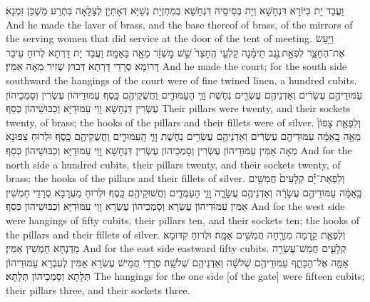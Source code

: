 {{{}}
{וַעֲבַד יָת כִּיּוֹרָא דִּנְחָשָׁא וְיָת בְּסִיסֵיהּ דִּנְחָשָׁא בְּמִחְזְיָת נְשַׁיָּא דְּאָתְיָן לְצַלָּאָה בִּתְרַע מַשְׁכַּן זִמְנָא׃}
{And he made the laver of brass, and the base thereof of brass, of the mirrors of the serving women that did service at the door of the tent of meeting.}{}
{וַיַּ֖עַשׂ אֶת־הֶחָצֵ֑ר לִפְאַ֣ת \legarmeh  נֶ֣גֶב תֵּימָ֗נָה קַלְעֵ֤י הֶֽחָצֵר֙ שֵׁ֣שׁ מׇשְׁזָ֔ר מֵאָ֖ה בָּאַמָּֽה׃}
{וַעֲבַד יָת דָּרְתָא לְרוּחַ עֵיבַר דָּרוֹמָא סְרָדֵי דָּרְתָא דְּבוּץ שְׁזִיר מְאָה אַמִּין׃}
{And he made the court; for the south side southward the hangings of the court were of fine twined linen, a hundred cubits.}{}
{עַמּוּדֵיהֶ֣ם עֶשְׂרִ֔ים וְאַדְנֵיהֶ֥ם עֶשְׂרִ֖ים נְחֹ֑שֶׁת וָוֵ֧י הָעַמּוּדִ֛ים וַחֲשֻׁקֵיהֶ֖ם כָּֽסֶף׃}
{עַמּוּדֵיהוֹן עֶשְׂרִין וְסָמְכֵיהוֹן עֶשְׂרִין דִּנְחָשָׁא וָוֵי עַמּוּדַיָּא וְכִבּוּשֵׁיהוֹן כְּסַף׃}
{Their pillars were twenty, and their sockets twenty, of brass; the hooks of the pillars and their fillets were of silver.}{}
{וְלִפְאַ֤ת צָפוֹן֙ מֵאָ֣ה בָֽאַמָּ֔ה עַמּוּדֵיהֶ֣ם עֶשְׂרִ֔ים וְאַדְנֵיהֶ֥ם עֶשְׂרִ֖ים נְחֹ֑שֶׁת וָוֵ֧י הָֽעַמּוּדִ֛ים וַחֲשֻׁקֵיהֶ֖ם כָּֽסֶף׃}
{וּלְרוּחַ צִפּוּנָא מְאָה אַמִּין עַמּוּדֵיהוֹן עֶשְׂרִין וְסָמְכֵיהוֹן עֶשְׂרִין דִּנְחָשָׁא וָוֵי עַמּוּדַיָּא וְכִבּוּשֵׁיהוֹן כְּסַף׃}
{And for the north side a hundred cubits, their pillars twenty, and their sockets twenty, of brass; the hooks of the pillars and their fillets of silver.}{}
{וְלִפְאַת־יָ֗ם קְלָעִים֙ חֲמִשִּׁ֣ים בָּֽאַמָּ֔ה עַמּוּדֵיהֶ֣ם עֲשָׂרָ֔ה וְאַדְנֵיהֶ֖ם עֲשָׂרָ֑ה וָוֵ֧י הָעַמֻּדִ֛ים וַחֲשׁוּקֵיהֶ֖ם כָּֽסֶף׃}
{וּלְרוּחַ מַעְרָבָא סְרָדֵי חַמְשִׁין אַמִּין עַמּוּדֵיהוֹן עֶשְׂרָא וְסָמְכֵיהוֹן עֶשְׂרָא וָוֵי עַמּוּדַיָּא וְכִבּוּשֵׁיהוֹן כְּסַף׃}
{And for the west side were hangings of fifty cubits, their pillars ten, and their sockets ten; the hooks of the pillars and their fillets of silver.}{}
{וְלִפְאַ֛ת קֵ֥דְמָה מִזְרָ֖חָה חֲמִשִּׁ֥ים אַמָּֽה׃}
{וּלְרוּחַ קִדּוּמָא מַדְנְחָא חַמְשִׁין אַמִּין׃}
{And for the east side eastward fifty cubits.}{}
{קְלָעִ֛ים חֲמֵשׁ־עֶשְׂרֵ֥ה אַמָּ֖ה אֶל־הַכָּתֵ֑ף עַמּוּדֵיהֶ֣ם שְׁלֹשָׁ֔ה וְאַדְנֵיהֶ֖ם שְׁלֹשָֽׁה׃}
{סְרָדֵי חֲמֵישׁ עֶשְׂרָא אַמִּין לְעִבְרָא עַמּוּדֵיהוֹן תְּלָתָא וְסָמְכֵיהוֹן תְּלָתָא׃}
{The hangings for the one side [of the gate] were fifteen cubits; their pillars three, and their sockets three.}{}
}
